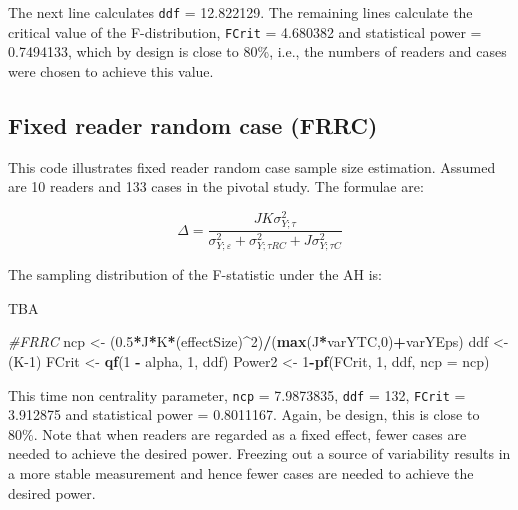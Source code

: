 \documentclass[]{book}
\newenvironment{Shaded}{\begin{snugshade}}{\end{snugshade}}
\newcommand{\CommentTok}[1]{\textcolor[rgb]{0.56,0.35,0.01}{\textit{#1}}}
\newcommand{\DataTypeTok}[1]{\textcolor[rgb]{0.13,0.29,0.53}{#1}}
\newcommand{\DecValTok}[1]{\textcolor[rgb]{0.00,0.00,0.81}{#1}}
\newcommand{\FloatTok}[1]{\textcolor[rgb]{0.00,0.00,0.81}{#1}}
\newcommand{\KeywordTok}[1]{\textcolor[rgb]{0.13,0.29,0.53}{\textbf{#1}}}
\newcommand{\NormalTok}[1]{#1}
\newcommand{\OperatorTok}[1]{\textcolor[rgb]{0.81,0.36,0.00}{\textbf{#1}}}
\newcommand{\StringTok}[1]{\textcolor[rgb]{0.31,0.60,0.02}{#1}}
\begin{document}
The next line calculates \texttt{ddf} = 12.822129. The remaining lines calculate the critical value of the F-distribution, \texttt{FCrit} = 4.680382 and statistical power = 0.7494133, which by design is close to 80\%, i.e., the numbers of readers and cases were chosen to achieve this value.

\hypertarget{fixed-reader-random-case-frrc}{%
\subsection{Fixed reader random case (FRRC)}\label{fixed-reader-random-case-frrc}}

This code illustrates fixed reader random case sample size estimation. Assumed are 10 readers and 133 cases in the pivotal study. The formulae are:

\[\Delta =\frac{JK\sigma _{Y;\tau }^{2}}{\sigma _{Y;\varepsilon }^{2}+\sigma _{Y;\tau RC}^{2}+J\sigma _{Y;\tau C}^{2}}\]

The sampling distribution of the F-statistic under the AH is:

TBA

\begin{Shaded}
\begin{Highlighting}[]
\CommentTok{#FRRC}
\NormalTok{ncp <-}\StringTok{ }\NormalTok{(}\FloatTok{0.5}\OperatorTok{*}\NormalTok{J}\OperatorTok{*}\NormalTok{K}\OperatorTok{*}\NormalTok{(effectSize)}\OperatorTok{^}\DecValTok{2}\NormalTok{)}\OperatorTok{/}\NormalTok{(}\KeywordTok{max}\NormalTok{(J}\OperatorTok{*}\NormalTok{varYTC,}\DecValTok{0}\NormalTok{)}\OperatorTok{+}\NormalTok{varYEps)}
\NormalTok{ddf <-}\StringTok{ }\NormalTok{(K}\DecValTok{-1}\NormalTok{)}
\NormalTok{FCrit <-}\StringTok{ }\KeywordTok{qf}\NormalTok{(}\DecValTok{1} \OperatorTok{-}\StringTok{ }\NormalTok{alpha, }\DecValTok{1}\NormalTok{, ddf)}
\NormalTok{Power2 <-}\StringTok{ }\DecValTok{1}\OperatorTok{-}\KeywordTok{pf}\NormalTok{(FCrit, }\DecValTok{1}\NormalTok{, ddf, }\DataTypeTok{ncp =}\NormalTok{ ncp)}
\end{Highlighting}
\end{Shaded}

This time non centrality parameter, \texttt{ncp} = 7.9873835, \texttt{ddf} = 132, \texttt{FCrit} = 3.912875 and statistical power = 0.8011167. Again, be design, this is close to 80\%. Note that when readers are regarded as a fixed effect, fewer cases are needed to achieve the desired power. Freezing out a source of variability results in a more stable measurement and hence fewer cases are needed to achieve the desired power.
\end{document}
